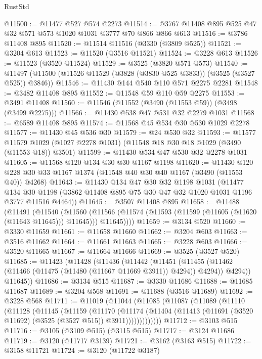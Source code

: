 \begin{lexlean}{RustStd}
\begin{coremodule}
@11500 := @11477 @527 @574 @2273
@11514 := @3767 @11408 @895 @525 @47 @32 @571 @573 @1020 @1031 @3777 @70 @866 @866 @613
@11516 := @3786 @11408 @895
@11520 := @11514 @11516 (@3330 (@3809 @525))
@11521 := @3204 @613
@11523 := @11520 (@3516 @11521)
@11524 := @3228 @613
@11526 := @11523 (@3520 @11524)
@11529 := @3525 (@3820 @571 @573)
@11540 := @11497 (@11500 (@11526 @11529 (@3828 (@3830 @525 @3833)) (@3525 (@3527 @525)) @3846))
@11546 := @11430 @144 @540 @110 @571 @2275 @2281
@11548 := @3482 @11408 @895
@11552 := @11548 @59 @110 @59 @2275
@11553 := @3491 @11408
@11560 := @11546 (@11552 (@3490 (@11553 @59)) (@3498 (@3499 @2275)))
@11566 := @11430 @538 @47 @531 @32 @2279 @1031
@11568 := @6589 @11408 @895
@11574 := @11568 @45 @534 @30 @530 @1029 @2278
@11577 := @11430 @45 @536 @30
@11579 := @24 @530 @32
@11593 := @11577
    @11579
    @1029
    (@1027 @2278 @1031)
    (@11548 @18 @30 @18 @1029 (@3490 (@11553 @18)) @3501)
@11599 := @11430 @534 @47 @530 @32 @2278 @1031
@11605 := @11568 @120 @134 @30 @30 @1167 @1198
@11620 := @11430 @120 @228 @30 @33 @1167 @1374 (@11548 @40 @30 @40 @1167 (@3490 (@11553 @40)) @4268)
@11643 := @11430
    @134
    @47
    @30
    @32
    @1198
    @1031
    (@11477 @134 @30 @1198 (@3862 @11408 @895 @75 @30 @47 @32 @1020 @1031 @1196 @3777 @11516 @4464))
@11645 := @3507 @11408 @895
@11658 := @11488
    (@11491
      (@11540
        (@11560
          (@11566 (@11574 (@11593 (@11599 (@11605 (@11620 (@11643 @11645))) @11645))) @11645))))
@11659 := @3134 @520
@11660 := @3330 @11659
@11661 := @11658 @11660
@11662 := @3204 @603
@11663 := @3516 @11662
@11664 := @11661 @11663
@11665 := @3228 @603
@11666 := @3520 @11665
@11667 := @11664 @11666
@11669 := @3525 (@3527 @520)
@11685 := @11423
    (@11428
      (@11436
        (@11442
          (@11451
            (@11455 (@11462 (@11466 (@11475 (@11480 (@11667 @11669 @3911)) @4294)) @4294))
            @4294))
        @11645))
@11686 := @3134 @515
@11687 := @3330 @11686
@11688 := @11685 @11687
@11689 := @3204 @568
@11691 := @11688 (@3516 @11689)
@11692 := @3228 @568
@11711 := @11019
    (@11044
      (@11085
        (@11087
          (@11089
            (@11110
              (@11128
                (@11145
                  (@11159
                    (@11170
                      (@11174
                        (@11404
                          (@11413 (@11691 (@3520 @11692) (@3525 (@3527 @515)) @3911)))))))))))))
@11712 := @3103 @515
@11716 := @3105 (@3109 @515) (@3115 @515)
@11717 := @3124 @11686
@11719 := @3120 (@11717 @3139)
@11721 := @3162 (@3163 @515)
@11722 := @3158 @11721
@11724 := @3120 (@11722 @3187)

\end{coremodule}
\end{lexlean}
